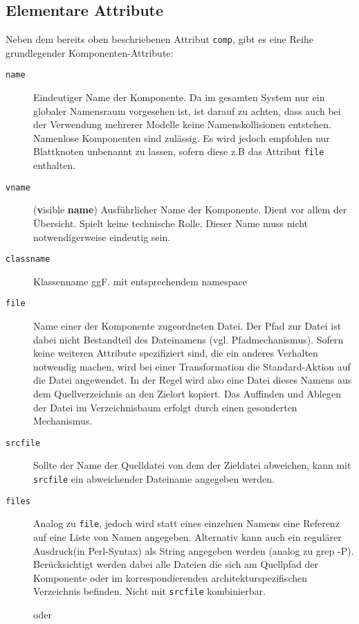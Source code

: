 \documentclass[a4paper]{article}
\begin{document}
\subsection{Elementare Attribute}
Neben dem bereits oben beschriebenen Attribut \texttt{comp}, gibt es eine Reihe
grundlegender Komponenten-Attribute:
\begin{description}
	\item[\texttt{name}] Eindeutiger Name der Komponente. Da im gesamten 
	System nur ein globaler Namensraum vorgesehen ist, ist darauf zu achten,
	dass auch bei der Verwendung mehrerer Modelle
	keine Namenskollisionen entstehen. Namenlose Komponenten sind zulässig. Es wird jedoch
	empfohlen nur Blattknoten unbenannt zu lassen, sofern diese z.B das Attribut \texttt{file}
	enthalten.
	\item[\texttt{vname}] (\textbf{v}isible \textbf{name}) Ausführlicher Name 
	der Komponente. Dient vor allem der Übersicht. Spielt keine technische
	Rolle. Dieser Name muss nicht notwendigerweise eindeutig sein.
	\item[\texttt{classname}] Klassenname ggF. mit  entsprechendem namespace
	\item[\texttt{file}] Name einer der Komponente zugeordneten Datei. Der Pfad zur
	Datei ist dabei nicht Bestandteil des Dateinamens (vgl. Pfadmechanismus). Sofern keine weiteren 
	Attribute spezifiziert sind, die ein anderes Verhalten notwendig machen,
	wird bei einer Transformation die Standard-Aktion auf die Datei angewendet.
	In der Regel wird also eine Datei dieses Namens aus dem Quellverzeichnis
	an den Zielort kopiert. Das Auffinden und Ablegen der Datei im Verzeichnisbaum
	erfolgt durch einen gesonderten Mechanismus.
	\item[\texttt{srcfile}] Sollte der Name der Quelldatei von dem der Zieldatei
	abweichen, kann mit \texttt{srcfile} ein abweichender Dateiname angegeben 
	werden.
	\item[\texttt{files}] Analog zu \texttt{file},  jedoch wird statt eines
	 einzelnen Namens eine Referenz auf eine Liste von Namen angegeben.
	 Alternativ kann auch ein regulärer Ausdruck(in Perl-Syntax) als String
	 angegeben werden (analog  zu grep -P). Berücksichtigt werden dabei alle
	 Dateien die sich am Quellpfad der Komponente oder im korrespondierenden 
	 architekturspezifischen Verzeichnis befinden.  
	 Nicht mit \texttt{srcfile} kombinierbar.
	
	oder
	
	
	
\end{description}
\end{document}
